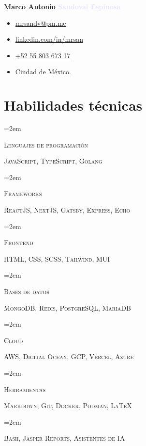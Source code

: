 \documentclass[letterpaper]{article}
\newlength{\spacebox}
\newcommand{\skill}[2]{
\noindent\hangindent=2em\hangafter=0
\parbox{3\spacebox}{
\textsc{#1}}
#2 \par
\vspace{0.5em}
}
\begin{document}
\thispagestyle{empty}
\noindent
\textbf{\Huge \textcolor{darklavender}{Marco Antonio} \textcolor{lavender}{Sandoval Espinosa}}\par

\begin{flushleft}

\end{flushleft}\par

\noindent
\begin{itemize}[itemsep=0em]
\item[\faAt] \href{mailto:mrsandv@pm.me}{mrsandv@pm.me}
\item[\faLinkedin]\href{https://linkedin.com/in/mrsan}{linkedin.com/in/mrsan}
\item[\faPhone] \href{tel:+525580367317}{+52 55 803 673 17}
\item[\faMapMarker] \textcolor{darklavender}{Ciudad de México.}
\end{itemize}

\section*{Habilidades técnicas}
\skill{Lenguajes de programación}{\textsc{JavaScript},  \textsc{TypeScript},  \textsc{Golang} }
\skill{Frameworks}{\textsc{ReactJS, NextJS, Gatsby, Express, Echo}}
\skill{Frontend}{\textsc{HTML, CSS, SCSS, Tailwind, MUI}}
\skill{Bases de datos}{\textsc{MongoDB, Redis, PostgreSQL, MariaDB}}
\skill{Cloud}{\textsc{AWS, Digital Ocean, GCP, Vercel, Azure}}
\skill{Herramientas}{\textsc{Markdown, Git, Docker, Podman, \LaTeX}}
\skill{ }{\textsc{Bash, Jasper Reports, Asistentes de IA}}
\end{document}
